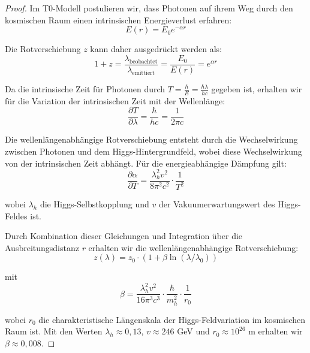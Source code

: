 \documentclass{article}
\theoremstyle{definition}
\theoremstyle{remark}
\begin{document}
		\begin{proof}
			Im T0-Modell postulieren wir, dass Photonen auf ihrem Weg durch den kosmischen Raum einen intrinsischen Energieverlust erfahren:
			\begin{equation}
				E(r) = E_0 e^{-\alpha r}
			\end{equation}
			
			Die Rotverschiebung $z$ kann daher ausgedrückt werden als:
			\begin{equation}
				1 + z = \frac{\lambda_{\text{beobachtet}}}{\lambda_{\text{emittiert}}} = \frac{E_0}{E(r)} = e^{\alpha r}
			\end{equation}
			
			Da die intrinsische Zeit für Photonen durch $T = \frac{\hbar}{E} = \frac{\hbar\lambda}{hc}$ gegeben ist, erhalten wir für die Variation der intrinsischen Zeit mit der Wellenlänge:
			\begin{equation}
				\frac{\partial T}{\partial \lambda} = \frac{\hbar}{hc} = \frac{1}{2\pi c}
			\end{equation}
			
			Die wellenlängenabhängige Rotverschiebung entsteht durch die Wechselwirkung zwischen Photonen und dem Higgs-Hintergrundfeld, wobei diese Wechselwirkung von der intrinsischen Zeit abhängt. Für die energieabhängige Dämpfung gilt:
			\begin{equation}
				\frac{\partial \alpha}{\partial T} = \frac{\lambda_h^2 v^2}{8\pi^2 c^2} \cdot \frac{1}{T^2}
			\end{equation}
			
			wobei $\lambda_h$ die Higgs-Selbstkopplung und $v$ der Vakuumerwartungswert des Higgs-Feldes ist.
			
			Durch Kombination dieser Gleichungen und Integration über die Ausbreitungsdistanz $r$ erhalten wir die wellenlängenabhängige Rotverschiebung:
			\begin{equation}
				z(\lambda) = z_0 \cdot (1 + \beta\ln(\lambda/\lambda_0))
			\end{equation}
			
			mit 
			\begin{equation}
				\beta = \frac{\lambda_h^2 v^2}{16\pi^3 c^3} \cdot \frac{\hbar}{m_h^2} \cdot \frac{1}{r_0}
			\end{equation}
			
			wobei $r_0$ die charakteristische Längenskala der Higgs-Feldvariation im kosmischen Raum ist. Mit den Werten $\lambda_h \approx 0,13$, $v \approx 246$ GeV und $r_0 \approx 10^{26}$ m erhalten wir $\beta \approx 0,008$.        
		\end{proof}
		
\end{document}
